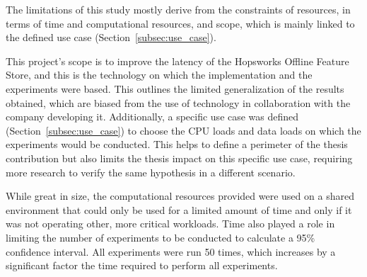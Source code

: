 The limitations of this study mostly derive from the constraints of resources, in terms of time and computational resources, and scope, which is mainly linked to the defined use case (Section~\ref{subsec:use_case}). 

This project's scope is to improve the latency of the Hopsworks Offline Feature Store, and this is the technology on which the implementation and the experiments were based. This outlines the limited generalization of the results obtained, which are biased from the use of technology in collaboration with the company developing it. Additionally, a specific use case was defined (Section~\ref{subsec:use_case}) to choose the \gls{CPU} loads and data loads on which the experiments would be conducted. This helps to define a perimeter of the thesis contribution but also limits the thesis impact on this specific use case, requiring more research to verify the same hypothesis in a different scenario.

While great in size, the computational resources provided were used on a shared environment that could only be used for a limited amount of time and only if it was not operating other, more critical workloads. Time also played a role in limiting the number of experiments to be conducted to calculate a 95\% confidence interval. All experiments were run 50 times, which increases by a significant factor the time required to perform all experiments. 